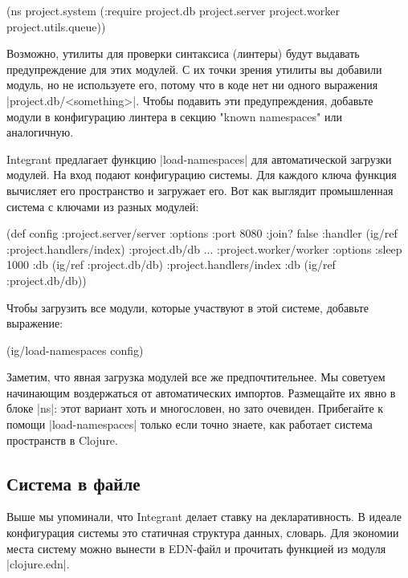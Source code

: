 \begin{code}
(ns project.system
  (:require project.db
            project.server
            project.worker
            project.utils.queue))
\end{code}

Возможно, утилиты для проверки синтаксиса (линтеры) будут выдавать
предупреждение для этих модулей. С их точки зрения утилиты вы добавили модуль,
но не используете его, потому что в коде нет ни одного выражения
\spverb|project.db/<something>|. Чтобы подавить эти предупреждения, добавьте модули в
конфигурацию линтера в секцию "known namespaces" или аналогичную.

Integrant предлагает функцию \spverb|load-namespaces| для автоматической загрузки
модулей. На вход подают конфигурацию системы. Для каждого ключа функция
вычисляет его пространство и загружает его. Вот как выглядит промышленная
система с ключами из разных модулей:

\begin{code}
(def config
  {:project.server/server {:options {:port 8080 :join? false}
                           :handler (ig/ref :project.handlers/index)}
   :project.db/db {...}
   :project.worker/worker {:options {:sleep 1000}
                           :db (ig/ref :project.db/db)}
   :project.handlers/index {:db (ig/ref :project.db/db)}})
\end{code}

Чтобы загрузить все модули, которые участвуют в этой системе, добавьте
выражение:

\begin{code}
(ig/load-namespaces config)
\end{code}

Заметим, что явная загрузка модулей все же предпочтительнее. Мы советуем
начинающим воздержаться от автоматических импортов. Размещайте их явно в блоке
\spverb|ns|: этот вариант хоть и многословен, но зато очевиден. Прибегайте к помощи
\spverb|load-namespaces| только если точно знаете, как работает система пространств в
Clojure.

\subsection{Система в файле}

Выше мы упоминали, что Integrant делает ставку на декларативность. В идеале
конфигурация системы это статичная структура данных, словарь. Для экономии места
систему можно вынести в EDN-файл и прочитать функцией из модуля \spverb|clojure.edn|.

